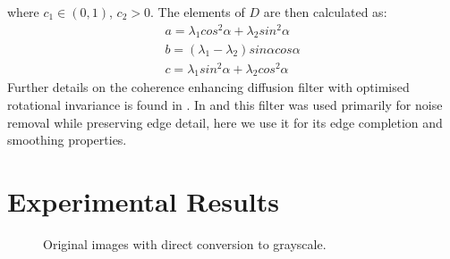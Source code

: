 where $c_1 \in (0,1)$, $c_2>0$. The elements of $D$ are then calculated as:
\begin{eqnarray}
a = \lambda_1 cos^2 \alpha + \lambda_2 sin^2 \alpha \\
b = (\lambda_1 - \lambda_2)sin \alpha cos \alpha \\
c = \lambda_1 sin^2 \alpha + \lambda_2 cos^2 \alpha
\end{eqnarray}
Further details on the coherence enhancing diffusion filter with optimised rotational invariance is found in \cite{Weickert2002}. In \citep{Maska2013} and \citep{Kroon2009} this filter was used primarily for noise removal while preserving edge detail, here we use it for its edge completion and smoothing properties.


\section{Experimental Results}
\label{sec:preprocessschemeexperimentalresults}

\begin{figure}[!h]
	\centering
	\caption{Original images with direct conversion to grayscale.}
	\label{fig:originaltogray}
\end{figure}


